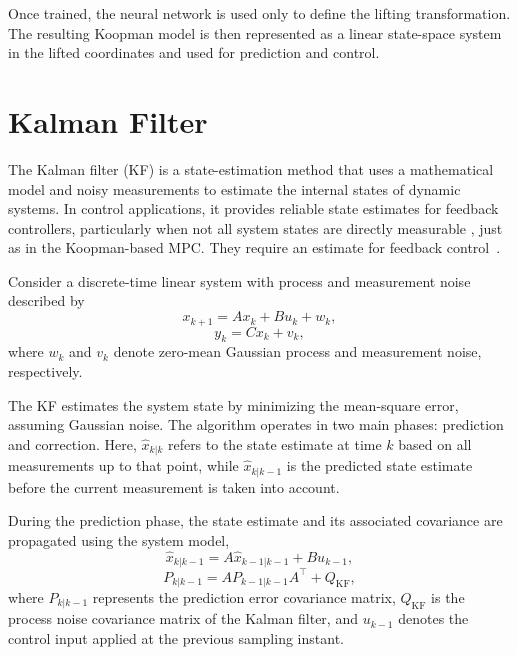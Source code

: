 Once trained, the neural network is used only to define the lifting transformation. 
The resulting Koopman model is then represented as a linear state-space system in the lifted coordinates and used for prediction and control.

\newpage
\section{Kalman Filter}
\label{sec:KF}

The Kalman filter (KF) is a state-estimation method that uses a mathematical model and noisy measurements to estimate the internal states of dynamic systems. In control applications, it provides reliable state estimates for feedback controllers, particularly when not all system states are directly measurable \cite{kalman1960,morari1999}, just as in the Koopman-based MPC. They require an estimate for feedback control~\cite{valabek2026experimental}.

Consider a discrete-time linear system with process and measurement noise described by
\begin{equation}
x_{k+1} = A x_k + B u_k + w_k,
\label{eq:strejc_state}
\end{equation}
\begin{equation}
y_k = C x_k + v_k,
\label{eq:strejc_state2}
\end{equation}
where $w_k$ and $v_k$ denote zero-mean Gaussian process and measurement noise, respectively.


The KF estimates the system state by minimizing the mean-square error, assuming Gaussian noise. The algorithm operates in two main phases: prediction and correction. Here, $\hat{x}_{k|k}$ refers to the state estimate at time $k$ based on all measurements up to that point, while $\hat{x}_{k|k-1}$ is the predicted state estimate before the current measurement is taken into account.

During the prediction phase, the state estimate and its associated covariance are propagated using the system model,
\begin{equation}
\hat{x}_{k|k-1} = A \hat{x}_{k-1|k-1} + B u_{k-1},
\end{equation}
\begin{equation}
P_{k|k-1} = A P_{k-1|k-1} A^\top + Q_{\mathrm{KF}},
\end{equation}
where $P_{k|k-1}$ represents the prediction error covariance matrix, $Q_{\mathrm{KF}}$ is the process noise covariance matrix of the Kalman filter, and $u_{k-1}$ denotes the control input applied at the previous sampling instant.


